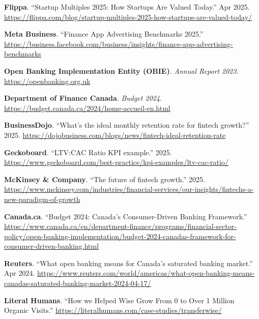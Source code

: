 \documentclass[11pt,letterpaper]{article}
\begin{document}
\begin{enumerate}[label={[{\arabic*}]}]
\item \textbf{Flippa}. ``Startup Multiples 2025: How Startups Are Valued Today.'' Apr 2025.  
      \url{https://flippa.com/blog/startup-multiples-2025-how-startups-are-valued-today/}

\item \textbf{Meta Business}. ``Finance App Advertising Benchmarks 2025.''  
      \url{https://business.facebook.com/business/insights/finance-app-advertising-benchmarks}

\item \textbf{Open Banking Implementation Entity (OBIE)}. \textit{Annual Report 2023}.  
      \url{https://openbanking.org.uk}

\item \textbf{Department of Finance Canada}. \textit{Budget 2024}.  
      \url{https://budget.canada.ca/2024/home-accueil-en.html}

\item \textbf{BusinessDojo}. ``What's the ideal monthly retention rate for fintech growth?'' 2025.  
      \url{https://dojobusiness.com/blogs/news/fintech-ideal-retention-rate}

\item \textbf{Geckoboard}. ``LTV:CAC Ratio KPI example.'' 2025.  
      \url{https://www.geckoboard.com/best-practice/kpi-examples/ltv-cac-ratio/}

\item \textbf{McKinsey \& Company}. ``The future of fintech growth.'' 2025.  
      \url{https://www.mckinsey.com/industries/financial-services/our-insights/fintechs-a-new-paradigm-of-growth}

\item \textbf{Canada.ca}. ``Budget 2024: Canada's Consumer-Driven Banking Framework.''  
      \url{https://www.canada.ca/en/department-finance/programs/financial-sector-policy/open-banking-implementation/budget-2024-canadas-framework-for-consumer-driven-banking.html}

\item \textbf{Reuters}. ``What open banking means for Canada's saturated banking market.'' Apr 2024.  
      \url{https://www.reuters.com/world/americas/what-open-banking-means-canadas-saturated-banking-market-2024-04-17/}

\item \textbf{Literal Humans}. ``How we Helped Wise Grow From 0 to Over 1 Million Organic Visits.''  
      \url{https://literalhumans.com/case-studies/transferwise/}


\end{enumerate}
\end{document}
